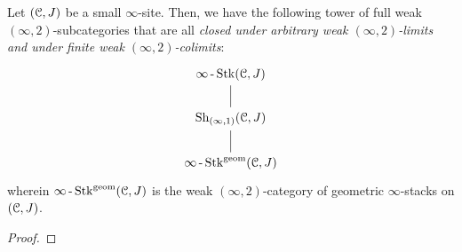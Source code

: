                 \begin{lemma} \label{lemma: derived_geometric_stack_categories}
                    Let $(\mathcal{C}, J)$ be a small $\infty$-site. Then, we have the following tower of full weak $(\infty, 2)$-subcategories that are all \textit{closed under arbitrary weak $(\infty, 2)$-limits and under finite weak $(\infty, 2)$-colimits}:
                        $$
                            \begin{tikzcd}
                            	{\infty\-\Stk(\C, J)} \\
                            	{\Sh_{(\infty,1)}(\C, J)} \\
                            	{\infty\-\Stk^{\geom}(\C, J)}
                            	\arrow[no head, from=3-1, to=2-1]
                            	\arrow[no head, from=2-1, to=1-1]
                            \end{tikzcd}
                        $$
                    wherein $\infty\operatorname{-}\mathrm{Stk}^{\mathrm{geom}}(\mathcal{C}, J)$ is the weak $(\infty, 2)$-category of geometric $\infty$-stacks on $(\mathcal{C}, J)$.
                \end{lemma}
                    \begin{proof}
                        
                    \end{proof}
                
